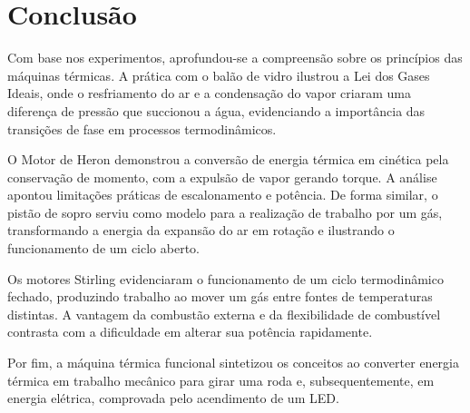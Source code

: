 \section{Conclusão} 
Com base nos experimentos, aprofundou-se a compreensão sobre os princípios das máquinas térmicas. A prática com o balão de vidro ilustrou a Lei dos Gases Ideais, onde o resfriamento do ar e a condensação do vapor criaram uma diferença de pressão que succionou a água, evidenciando a importância das transições de fase em processos termodinâmicos.

O Motor de Heron demonstrou a conversão de energia térmica em cinética pela conservação de momento, com a expulsão de vapor gerando torque. A análise apontou limitações práticas de escalonamento e potência. De forma similar, o pistão de sopro serviu como modelo para a realização de trabalho por um gás, transformando a energia da expansão do ar em rotação e ilustrando o funcionamento de um ciclo aberto.

Os motores Stirling evidenciaram o funcionamento de um ciclo termodinâmico fechado, produzindo trabalho ao mover um gás entre fontes de temperaturas distintas. A vantagem da combustão externa e da flexibilidade de combustível contrasta com a dificuldade em alterar sua potência rapidamente.

Por fim, a máquina térmica funcional sintetizou os conceitos ao converter energia térmica em trabalho mecânico para girar uma roda e, subsequentemente, em energia elétrica, comprovada pelo acendimento de um LED.
